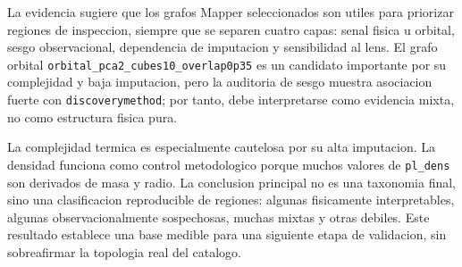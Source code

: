 La evidencia sugiere que los grafos Mapper seleccionados son utiles para priorizar regiones de inspeccion, siempre que se separen cuatro capas: senal fisica u orbital, sesgo observacional, dependencia de imputacion y sensibilidad al lens. El grafo orbital \texttt{orbital\_pca2\_cubes10\_overlap0p35} es un candidato importante por su complejidad y baja imputacion, pero la auditoria de sesgo muestra asociacion fuerte con \texttt{discoverymethod}; por tanto, debe interpretarse como evidencia mixta, no como estructura fisica pura.

La complejidad termica es especialmente cautelosa por su alta imputacion. La densidad funciona como control metodologico porque muchos valores de \texttt{pl\_dens} son derivados de masa y radio. La conclusion principal no es una taxonomia final, sino una clasificacion reproducible de regiones: algunas fisicamente interpretables, algunas observacionalmente sospechosas, muchas mixtas y otras debiles. Este resultado establece una base medible para una siguiente etapa de validacion, sin sobreafirmar la topologia real del catalogo.
